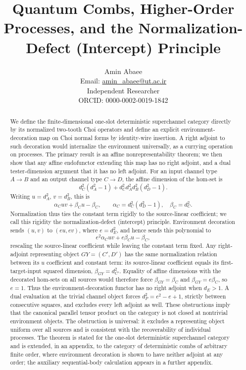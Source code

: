 \documentclass[11pt,a4paper]{article}
\title{\textbf{Quantum Combs, Higher-Order Processes, and the Normalization-Defect (Intercept) Principle}}
\author{Amin Abaee\\
\small Email: \href{mailto:amin_abaee@ut.ac.ir}{amin\_abaee@ut.ac.ir}\\
\small Independent Researcher\\
\small ORCID: 0000-0002-0019-1842}
\date{}
\theoremstyle{definition}
\theoremstyle{plain}
\theoremstyle{remark}
\begin{document}
\maketitle

\begin{abstract}
We define the finite-dimensional one-slot deterministic superchannel
category directly by its normalized two-tooth Choi operators and define
an explicit environment-decoration map on Choi normal forms by
identity-wire insertion. A right adjoint to such decoration would
internalize the environment universally, as a currying operation on
processes. The primary result is an affine nonrepresentability theorem;
we then show that any affine endofunctor extending this map has no right
adjoint, and a dual tester-dimension argument that it has no left adjoint. For an input channel type $A\to B$ and an output
channel type $C\to D$, the affine dimension of the hom-set is
\[
d_C^2(d_A^2-1)+d_C^2d_A^2d_B^2(d_D^2-1).
\]
Writing $u=d_A^2$, $v=d_B^2$, this is
\[
\alpha_Cuv+\beta_Cu-\beta_C,
\qquad \alpha_C=d_C^2(d_D^2-1),\quad \beta_C=d_C^2.
\]
Normalization thus ties the constant term rigidly to the source-linear
coefficient; we call this rigidity the normalization-defect (intercept)
principle. Environment decoration sends $(u,v)$ to $(eu,ev)$, where
$e=d_E^2$, and hence sends this polynomial to
\[
e^2\alpha_Cuv+e\beta_Cu-\beta_C,
\]
rescaling the source-linear coefficient while leaving the constant term
fixed.
Any right-adjoint representing object $GY=(C',D')$ has the same normalization
relation between its $u$ coefficient and constant term: its source-linear
coefficient equals its first-target-input squared dimension,
$\beta_{GY}=d_{C'}^2$. Equality of affine dimensions with the decorated
hom-sets on all sources would therefore force $\beta_{GY}=\beta_C$ and
$\beta_{GY}=e\beta_C$, so $e=1$. Thus the
environment-decoration functor has no right adjoint when $d_E>1$.
A dual evaluation at the trivial channel object forces
$d_P^2=e^2-e+1$, strictly between consecutive squares, and excludes every
left adjoint as well.
These obstructions imply that the canonical parallel tensor product on
the category is not closed at nontrivial environment objects.
The obstruction is universal: it excludes a representing object uniform
over all sources and is consistent with the recoverability of individual
processes.
The theorem is stated for the one-slot deterministic superchannel
category and is extended, in an appendix, to the category of
deterministic combs of arbitrary finite order, where environment
decoration is shown to have neither adjoint at any order; the auxiliary
sequential-body calculation appears in a further appendix.
\end{abstract}
\end{document}

